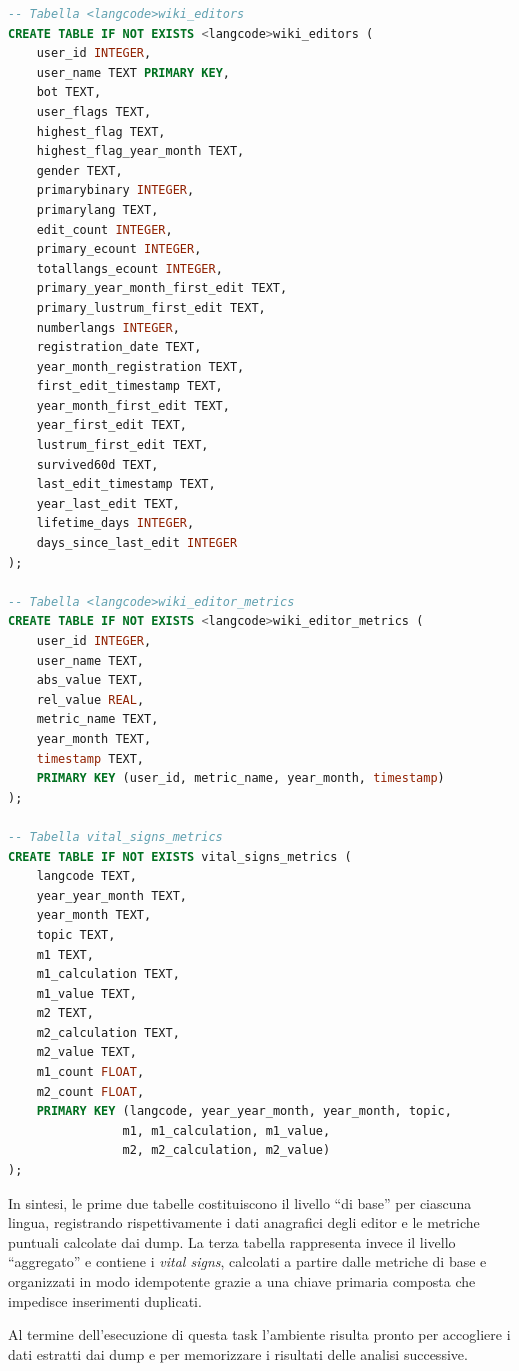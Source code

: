 \begin{lstlisting}[language=SQL, caption={Definizione delle tabelle create dalla task create\_dbs}, label=lst:create_dbs_tables, basicstyle=\scriptsize\ttfamily]
-- Tabella <langcode>wiki_editors
CREATE TABLE IF NOT EXISTS <langcode>wiki_editors (
    user_id INTEGER,
    user_name TEXT PRIMARY KEY,
    bot TEXT,
    user_flags TEXT,
    highest_flag TEXT,
    highest_flag_year_month TEXT,
    gender TEXT,
    primarybinary INTEGER,
    primarylang TEXT,
    edit_count INTEGER,
    primary_ecount INTEGER,
    totallangs_ecount INTEGER,
    primary_year_month_first_edit TEXT,
    primary_lustrum_first_edit TEXT,
    numberlangs INTEGER,
    registration_date TEXT,
    year_month_registration TEXT,
    first_edit_timestamp TEXT,
    year_month_first_edit TEXT,
    year_first_edit TEXT,
    lustrum_first_edit TEXT,
    survived60d TEXT,
    last_edit_timestamp TEXT,
    year_last_edit TEXT,
    lifetime_days INTEGER,
    days_since_last_edit INTEGER
);

-- Tabella <langcode>wiki_editor_metrics
CREATE TABLE IF NOT EXISTS <langcode>wiki_editor_metrics (
    user_id INTEGER,
    user_name TEXT,
    abs_value TEXT,
    rel_value REAL,
    metric_name TEXT,
    year_month TEXT,
    timestamp TEXT,
    PRIMARY KEY (user_id, metric_name, year_month, timestamp)
);

-- Tabella vital_signs_metrics
CREATE TABLE IF NOT EXISTS vital_signs_metrics (
    langcode TEXT,
    year_year_month TEXT,
    year_month TEXT,
    topic TEXT,
    m1 TEXT,
    m1_calculation TEXT,
    m1_value TEXT,
    m2 TEXT,
    m2_calculation TEXT,
    m2_value TEXT,
    m1_count FLOAT,
    m2_count FLOAT,
    PRIMARY KEY (langcode, year_year_month, year_month, topic, 
                m1, m1_calculation, m1_value, 
                m2, m2_calculation, m2_value)
);
\end{lstlisting}

In sintesi, le prime due tabelle costituiscono il livello “di base” per ciascuna lingua, registrando rispettivamente i dati anagrafici degli editor e le metriche puntuali calcolate dai dump. 
La terza tabella rappresenta invece il livello “aggregato” e contiene i \emph{vital signs}, calcolati a partire dalle metriche di base e organizzati in modo idempotente grazie a una chiave primaria composta che impedisce inserimenti duplicati.  

Al termine dell’esecuzione di questa task l’ambiente risulta pronto per accogliere i dati estratti dai dump e per memorizzare i risultati delle analisi successive.

